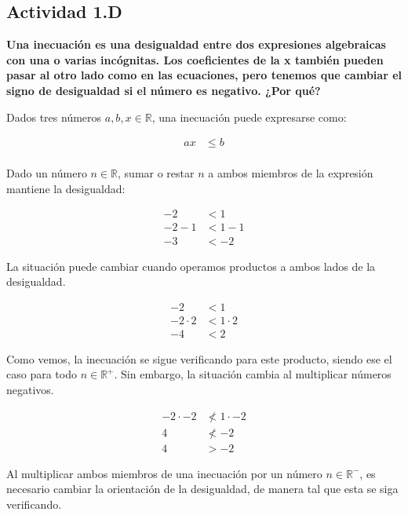 \subsection*{Actividad 1.D}
\textbf{Una inecuación es una desigualdad entre dos expresiones
	algebraicas con una o varias incógnitas.
	Los coeficientes de la x también pueden pasar al otro lado como en
	las ecuaciones, pero tenemos que cambiar el signo de
	desigualdad si el número es negativo. ¿Por qué?}

Dados tres números $a, b, x \in \mathbb{R}$, una inecuación puede expresarse como:

\begin{align*}
	ax & \leq b \\
\end{align*}

Dado un número $n \in \mathbb{R}$, sumar o restar $n$ a ambos miembros de la expresión mantiene la desigualdad:

\begin{align*}
	-2     & < 1     \\
	-2 - 1 & < 1 - 1 \\
	-3     & < -2
\end{align*}

La situación puede cambiar cuando operamos productos a ambos lados de la desigualdad.

\begin{align*}
	-2         & < 1         \\
	-2 \cdot 2 & < 1 \cdot 2 \\
	-4         & < 2
\end{align*}

Como vemos, la inecuación se sigue verificando para este producto, siendo ese el caso para todo $n \in \mathbb{R^+}$. Sin embargo, la situación cambia al multiplicar números negativos.

\begin{align*}
	-2 \cdot -2 & \not < 1 \cdot -2 \\
	4           & \not < -2         \\
	4           & > -2
\end{align*}

Al multiplicar ambos miembros de una inecuación por un número $n \in \mathbb{R^-}$, es necesario cambiar la orientación de la desigualdad, de manera tal que esta se siga verificando.
